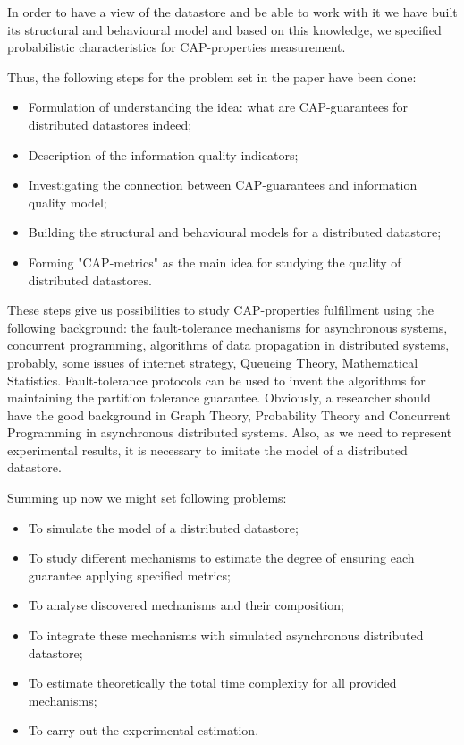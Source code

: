 \documentclass{llncs}
\begin{document}
In order to have a view of the datastore and be able to work with it 
we have built its structural and behavioural model and based on this knowledge,
we specified probabilistic characteristics for CAP-properties measurement.
 
Thus, the following steps for the problem set in the paper have been done:
\begin{itemize}
\item Formulation of understanding the idea: what are CAP-guarantees for distributed 
datastores indeed;
\item Description of the information quality indicators;
\item Investigating the connection between CAP-guarantees and information quality model;
\item Building the structural and behavioural models for a distributed datastore;
\item Forming "CAP-metrics" as the main idea for studying the quality of distributed datastores.
\end{itemize}

These steps give us possibilities to study CAP-properties fulfillment using the following background:
the fault-tolerance mechanisms for asynchronous systems, concurrent programming, algorithms 
of data propagation in distributed systems, probably, some issues of internet strategy, 
Queueing Theory, Mathematical Statistics. 
Fault-tolerance protocols can be used to invent the algorithms for maintaining the partition tolerance guarantee.
Obviously, a researcher should have the good background in Graph Theory, Probability Theory and Concurrent Programming in asynchronous distributed systems.
Also, as we need to represent experimental results, it is necessary to imitate the model of a distributed datastore.

Summing up now we might set following problems: 
\begin{itemize}
\item To simulate the model of a distributed datastore;
\item To study different mechanisms to estimate the degree of ensuring each guarantee 
applying specified metrics;
\item To analyse discovered mechanisms and their composition;
\item To integrate these mechanisms with simulated asynchronous distributed datastore;
\item To estimate theoretically the total time complexity for all provided mechanisms;
\item To carry out the experimental estimation.
\end{itemize}
\end{document}
